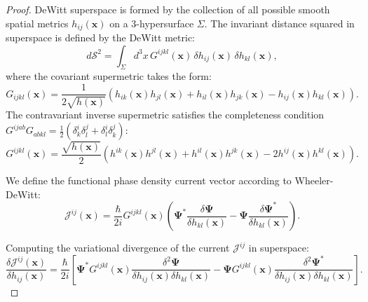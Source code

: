 \begin{proof}
DeWitt superspace is formed by the collection of all possible smooth spatial metrics $h_{ij}(\mathbf{x})$ on a 3-hypersurface $\Sigma$. The invariant distance squared in superspace is defined by the DeWitt metric:
\begin{equation}\label{eq:1.93}\tag{1.93}
d\mathcal{S}^2 = \int_\Sigma d^3x \, G^{ijkl}(\mathbf{x}) \, \delta h_{ij}(\mathbf{x}) \, \delta h_{kl}(\mathbf{x}),
\end{equation}
where the covariant supermetric takes the form:
\begin{equation}\label{eq:1.94}\tag{1.94}
G_{ijkl}(\mathbf{x}) = \frac{1}{2\sqrt{h(\mathbf{x})}} \left( h_{ik}(\mathbf{x}) h_{jl}(\mathbf{x}) + h_{il}(\mathbf{x}) h_{jk}(\mathbf{x}) - h_{ij}(\mathbf{x}) h_{kl}(\mathbf{x}) \right).
\end{equation}
The contravariant inverse supermetric satisfies the completeness condition $G^{ijab} G_{abkl} = \frac{1}{2}(\delta^i_k \delta^j_l + \delta^i_l \delta^j_k)$:
\begin{equation}\label{eq:1.95}\tag{1.95}
G^{ijkl}(\mathbf{x}) = \frac{\sqrt{h(\mathbf{x})}}{2} \left( h^{ik}(\mathbf{x}) h^{jl}(\mathbf{x}) + h^{il}(\mathbf{x}) h^{jk}(\mathbf{x}) - 2 h^{ij}(\mathbf{x}) h^{kl}(\mathbf{x}) \right).
\end{equation}

We define the functional phase density current vector according to Wheeler-DeWitt:
\begin{equation}\label{eq:1.96}\tag{1.96}
\mathcal{J}^{ij}(\mathbf{x}) = \frac{\hbar}{2i} G^{ijkl}(\mathbf{x}) \left( \mathbf{\Psi}^* \frac{\delta \mathbf{\Psi}}{\delta h_{kl}(\mathbf{x})} - \mathbf{\Psi} \frac{\delta \mathbf{\Psi}^*}{\delta h_{kl}(\mathbf{x})} \right).
\end{equation}

Computing the variational divergence of the current $\mathcal{J}^{ij}$ in superspace:
\begin{equation}\label{eq:1.97}\tag{1.97}
\frac{\delta \mathcal{J}^{ij}(\mathbf{x})}{\delta h_{ij}(\mathbf{x})} = \frac{\hbar}{2i} \left[ \mathbf{\Psi}^* G^{ijkl}(\mathbf{x}) \frac{\delta^2 \mathbf{\Psi}}{\delta h_{ij}(\mathbf{x}) \delta h_{kl}(\mathbf{x})} - \mathbf{\Psi} G^{ijkl}(\mathbf{x}) \frac{\delta^2 \mathbf{\Psi}^*}{\delta h_{ij}(\mathbf{x}) \delta h_{kl}(\mathbf{x})} \right].
\end{equation}


\end{proof}
